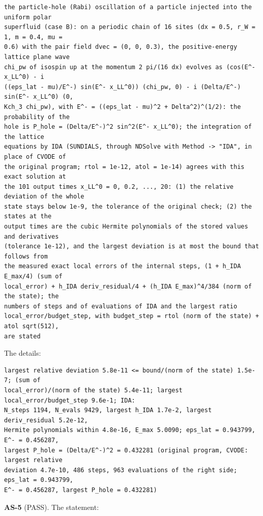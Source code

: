 \documentclass[
  10pt,
]{article}
\begin{document}
\begin{verbatim}
the particle-hole (Rabi) oscillation of a particle injected into the uniform polar
superfluid (case B): on a periodic chain of 16 sites (dx = 0.5, r_W = 1, m = 0.4, mu =
0.6) with the pair field dvec = (0, 0, 0.3), the positive-energy lattice plane wave
chi_pw of isospin up at the momentum 2 pi/(16 dx) evolves as (cos(E^- x_LL^0) - i
((eps_lat - mu)/E^-) sin(E^- x_LL^0)) (chi_pw, 0) - i (Delta/E^-) sin(E^- x_LL^0) (0,
Kch_3 chi_pw), with E^- = ((eps_lat - mu)^2 + Delta^2)^(1/2): the probability of the
hole is P_hole = (Delta/E^-)^2 sin^2(E^- x_LL^0); the integration of the lattice
equations by IDA (SUNDIALS, through NDSolve with Method -> "IDA", in place of CVODE of
the original program; rtol = 1e-12, atol = 1e-14) agrees with this exact solution at
the 101 output times x_LL^0 = 0, 0.2, ..., 20: (1) the relative deviation of the whole
state stays below 1e-9, the tolerance of the original check; (2) the states at the
output times are the cubic Hermite polynomials of the stored values and derivatives
(tolerance 1e-12), and the largest deviation is at most the bound that follows from
the measured exact local errors of the internal steps, (1 + h_IDA E_max/4) (sum of
local_error) + h_IDA deriv_residual/4 + (h_IDA E_max)^4/384 (norm of the state); the
numbers of steps and of evaluations of IDA and the largest ratio
local_error/budget_step, with budget_step = rtol (norm of the state) + atol sqrt(512),
are stated
\end{verbatim}

The details:

\begin{verbatim}
largest relative deviation 5.8e-11 <= bound/(norm of the state) 1.5e-7; (sum of
local_error)/(norm of the state) 5.4e-11; largest local_error/budget_step 9.6e-1; IDA:
N_steps 1194, N_evals 9429, largest h_IDA 1.7e-2, largest deriv_residual 5.2e-12,
Hermite polynomials within 4.8e-16, E_max 5.0090; eps_lat = 0.943799, E^- = 0.456287,
largest P_hole = (Delta/E^-)^2 = 0.432281 (original program, CVODE: largest relative
deviation 4.7e-10, 486 steps, 963 evaluations of the right side; eps_lat = 0.943799,
E^- = 0.456287, largest P_hole = 0.432281)
\end{verbatim}

\textbf{AS-5} (PASS). The statement:
\end{document}
